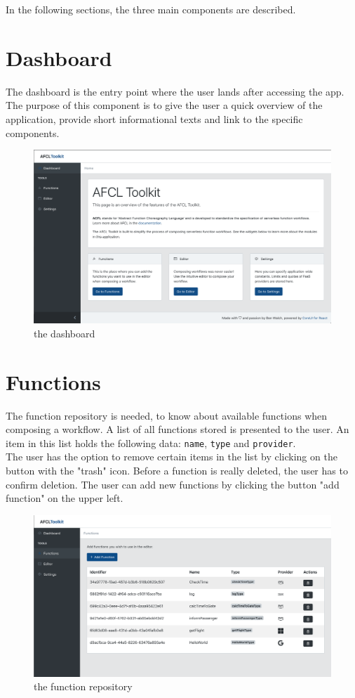 \documentclass[a4paper,12pt,pdftex,halfparskip,cleardoubleempty,bibtotoc,liststotoc]{scrbook}
\begin{document}
In the following sections, the three main components are described.

\section{Dashboard}

The dashboard is the entry point where the user lands after accessing the app. The purpose of this component is to give the user a quick overview of the application, provide short informational texts and link to the specific components. 

\begin{figure}[H]
  \centering
  \includegraphics[width=\textwidth]{dashboard}
  \caption{the dashboard}
\end{figure}

\section{Functions}

The function repository is needed, to know about available functions when composing a workflow.  A list of all functions stored is presented to the user. An item in this list holds the following data: \texttt{name}, \texttt{type} and \texttt{provider}.\\
The user has the option to remove certain items in the list by clicking on the button with the "trash" icon. Before a function is really deleted, the user has to confirm deletion.
The user can add new functions by clicking the button "add function" on the upper left.

\begin{figure}[H]
  \centering
  \includegraphics[width=\textwidth]{functions}
  \caption{the function repository}
\end{figure}
\end{document}
